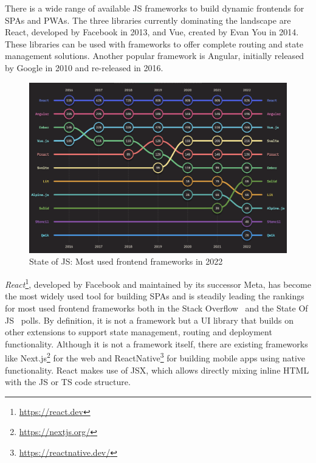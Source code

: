 There is a wide range of available \ac{JS} frameworks to build dynamic frontends for \ac{SPA}s and \ac{PWA}s. The three libraries currently dominating the landscape are React, developed by Facebook in 2013, and Vue, created by Evan You in 2014.
These libraries can be used with frameworks to offer complete routing and state management solutions.
Another popular framework is Angular, initially released by Google in 2010 and re-released in 2016.

\begin{figure}[h]
    \centering
    \includegraphics[scale=0.4]{04_Artefakte/01_Abbildungen/stateofjs-usage-frontend-frameworks-2022}
    \caption[Most used frontend frameworks in 2022]{State of JS: Most used frontend frameworks in 2022 \parencite{mostUsedFrontendFrameworks22}\protect}
    \label{fig:mostUsedFrameworks}
\end{figure}

\emph{React}\footnote{\url{https://react.dev}}, developed by Facebook and maintained by its successor Meta, has become the most widely used tool for building \ac{SPA}s and is steadily leading the rankings for most used frontend frameworks both in the Stack Overflow~\parencite{stackOverflowPollWebFrameworks23} and the State Of JS~\parencite{mostUsedFrontendFrameworks22} polls.
By definition, it is not a framework but a \ac{UI} library that builds on other extensions to support state management, routing and deployment functionality.
Although it is not a framework itself, there are existing frameworks like Next.js\footnote{\url{https://nextjs.org/}} for the web and ReactNative\footnote{\url{https://reactnative.dev/}} for building mobile apps using native functionality.
React makes use of \ac{JSX}, which allows directly mixing inline \ac{HTML} with the \ac{JS} or \ac{TS} code structure.

